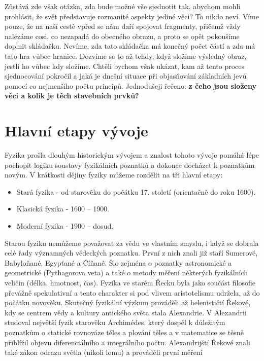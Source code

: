 {    Zůstává zde však otázka, zda bude možné vše sjednotit tak, abychom mohli prohlásit, že svět 
    představuje rozmanité aspekty jediné věci? To nikdo neví. Víme pouze, že na naší cestě vpřed se 
    nám daří spojovat fragmenty, přičemž vždy nalézáme cosi, co nezapadá do obecného obrazu, a 
    proto se opět pokoušíme doplnit skládačku. Nevíme, zda tato skládačka má konečný počet částí a 
    zda má tato hra vůbec hranice. Dozvíme se to až tehdy, když složíme výsledný obraz, jestli ho 
    vůbec kdy složíme. Chtěli bychom však ukázat, kam až tento proces sjednocování pokročil a jaká 
    je dnešní situace při objasňování základních jevů pomocí co nejmenšího počtu principů. 
    Jednodušeji řečeno: \textbf{z čeho jsou složeny věci a kolik je těch stavebních prvků?} 
    \cite[s.~27]{Feynman02}
    
  \section{Hlavní etapy vývoje}\label{fyz:IchapIsecIII}
    Fyzika prošla dlouhým historickým vývojem a znalost tohoto vývoje pomáhá lépe pochopit logiku 
    soustavy fyzikálních poznatků a dokonce do\-cházet k poznatkům novým. V krátkosti dějiny 
    fyziky můžeme rozdělit na tři hlavní etapy:
    \begin{itemize}
     	\item Stará fyzika - od starověku do počátku 17. století (orientačně do roku 1600).
     \item Klasická fyzika - 1600 – 1900.
     \item Moderní fyzika - 1900 – dosud.
    \end{itemize}
    Starou fyziku nemůžeme považovat za vědu ve vlastním smyslu, i když se dobrala celé řady 
    významných vědeckých poznatku. První z nich znali již staří Sumerové, Babyloňané, Egypťané a 
    Číňané. Šlo zejména o  poznatky astronomické a geometrické (Pythagorova veta) a také o metody 
    měření některých fyzikálních veličin (délka, hmotnost, čas). Fyzika ve starém Řecku byla jako 
    součást filosofie převážně spekulativní a tento charakter si pod vlivem aristotelismu udržela, 
    až do počátku novověku. Skutečný fyzikální výzkum prováděli až helenističtí Řekové, kdy se 
    centrem vědy a kultury antického světa stala Alexandrie. V Alexandrii studoval největší fyzik 
    starověku Archimédes, který dospěl k důležitým poznatkům o statické rovnováze těles a plování 
    těles a v matematice se těsně přiblížil objevu diferenciálního a integrálního počtu. 
    Alexandrijští Řekové znali také zákon odrazu světla (nikoli lomu) a prováděli první měření 
}
